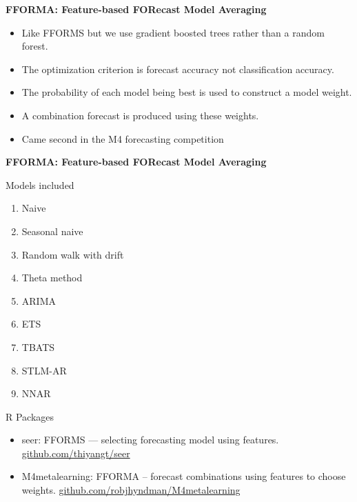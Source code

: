 \documentclass[14pt,ignorenonframetext,]{beamer}
\providecommand{\tightlist}{%
  \setlength{\itemsep}{0pt}\setlength{\parskip}{0pt}}
\begin{document}
\begin{frame}{\fontsize{15}{15}\sffamily\bfseries FFORMA: Feature-based FORecast Model Averaging}
\protect\hypertarget{section-1}{}

\begin{itemize}
\tightlist
\item
  Like FFORMS but we use gradient boosted trees rather than a random
  forest.
\item
  The optimization criterion is forecast accuracy not classification
  accuracy.
\item
  The probability of each model being best is used to construct a model
  weight.
\item
  A combination forecast is produced using these weights.
\item
  \alert{Came second in the M4 forecasting competition}
\end{itemize}

\end{frame}

\begin{frame}{\fontsize{15}{15}\sffamily\bfseries FFORMA: Feature-based FORecast Model Averaging}
\protect\hypertarget{section-2}{}

\begin{block}{Models included}

\begin{enumerate}
\tightlist
\item
  Naive
\item
  Seasonal naive
\item
  Random walk with drift
\item
  Theta method
\item
  ARIMA
\item
  ETS
\item
  TBATS
\item
  STLM-AR
\item
  NNAR
\end{enumerate}

\end{block}

\end{frame}

\begin{frame}{R Packages}
\protect\hypertarget{r-packages}{}

\fontsize{14.5}{19}\sf

\begin{itemize}
\item
  \alert{seer}: FFORMS --- selecting forecasting model using features.
  \newline\url{github.com/thiyangt/seer}\vspace*{0.5cm}
\item
  \alert{M4metalearning}: FFORMA -- forecast combinations using features
  to choose weights. \newline\url{github.com/robjhyndman/M4metalearning}
\end{itemize}

\end{frame}
\end{document}
